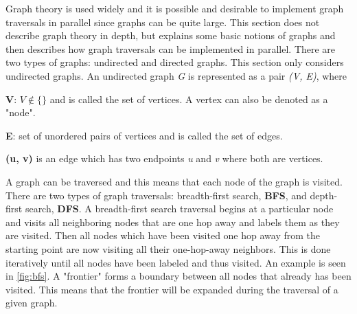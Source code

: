 Graph theory is used widely and it is possible and desirable to implement graph traversals in parallel since graphs can be quite large.
This section does not describe graph theory in depth, but explains some basic notions of graphs and then describes how graph traversals can be implemented in parallel.
There are two types of graphs: undirected and directed graphs.
This section only considers undirected graphs.
An undirected graph \textit{G} is represented as a pair \textit{(V, E)}, where
\begin{itemizeSmall}
	\item[\textbf{V}:] $V\notin \{\}$ and is called the set of vertices. A vertex can also be denoted as a "node".
	\item[\textbf{E}:] set of unordered pairs of vertices and is called the set of edges.
	\item[\textbf{(u, v)}] is an edge which has two endpoints \textit{u} and \textit{v} where both are vertices.
\end{itemizeSmall}

\noindent A graph can be traversed and this means that each node of the graph is visited.
There are two types of graph traversals: breadth-first search, \textbf{BFS}, and depth-first search, \textbf{DFS}.
A breadth-first search traversal begins at a particular node and visits all neighboring nodes that are one hop away and labels them as they are visited. 
Then all nodes which have been visited one hop away from the starting point are now visiting all their one-hop-away neighbors. 
This is done iteratively until all nodes have been labeled and thus visited.
An example is seen in \autoref{fig:bfs}.
A "frontier" forms a boundary between all nodes that already has been visited.
This means that the frontier will be expanded during the traversal of a given graph.

